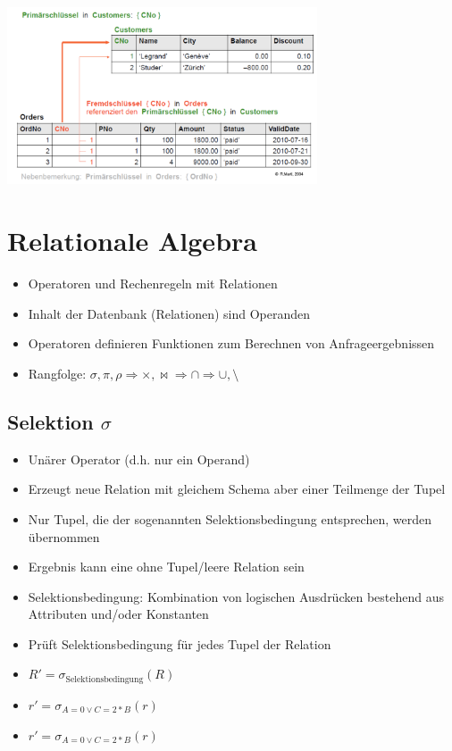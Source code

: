 \documentclass[8pt,a4paper]{scrartcl}
\begin{document}
\begin{multicols*}{3}
					\includegraphics[height=5.25cm]{img/pkfk.png} 	
					
		\section{Relationale Algebra}
			\begin{itemize}\itemsep0pt			
				\item Operatoren und Rechenregeln mit Relationen
				\item Inhalt der Datenbank (Relationen) sind Operanden
				\item Operatoren definieren Funktionen zum Berechnen von Anfrageergebnissen
				\item Rangfolge: $\sigma , \pi , \rho \Rightarrow \times , \bowtie \Rightarrow \cap \Rightarrow\cup , \setminus$
			\end{itemize}
					
			\subsection{Selektion $\sigma$}
				\begin{itemize}\itemsep0pt			
					\item Unärer Operator (d.h. nur ein Operand)
					\item Erzeugt neue Relation mit gleichem Schema aber einer Teilmenge der
Tupel
					\item Nur Tupel, die der sogenannten Selektionsbedingung entsprechen, werden übernommen
					\item Ergebnis kann eine ohne Tupel/leere Relation sein
					\item Selektionsbedingung: Kombination von logischen Ausdrücken bestehend aus Attributen und/oder Konstanten
					\item Prüft Selektionsbedingung für jedes Tupel der Relation
					\item $R' = \sigma_{\text{Selektionsbedingung}}(R)$
					\item $r' = \sigma_{A=0 \vee C=2*B}(r)$
					\item $r' = \sigma_{A=0 \vee C=2*B}(r)$						
				\end{itemize}
				

\end{multicols*}
\end{document}
